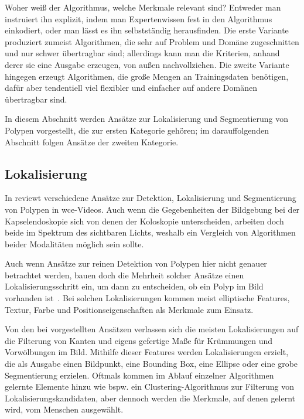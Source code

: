 Woher weiß der Algorithmus, welche Merkmale relevant sind?
Entweder man instruiert ihn explizit, indem man Expertenwissen fest in den Algorithmus einkodiert, oder man lässt es ihn selbstständig herausfinden.
Die erste Variante produziert zumeist Algorithmen, die sehr auf Problem und Domäne zugeschnitten und nur schwer übertragbar sind; allerdings kann man die Kriterien, anhand derer sie eine Ausgabe erzeugen, von außen nachvollziehen.
Die zweite Variante hingegen erzeugt Algorithmen, die große Mengen an Trainingsdaten benötigen, dafür aber tendentiell viel flexibler und einfacher auf andere Domänen übertragbar sind.

In diesem Abschnitt werden Ansätze zur Lokalisierung und Segmentierung von Polypen vorgestellt, die zur ersten Kategorie gehören; im darauffolgenden Abschnitt folgen Ansätze der zweiten Kategorie.



\subsection{Lokalisierung}

In \cite{Prasath.2016} reviewt \citeauthor{Prasath.2016} verschiedene Ansätze zur Detektion, Lokalisierung und Segmentierung von Polypen in \gls{wce}-Videos.
Auch wenn die Gegebenheiten der Bildgebung bei der Kapselendoskopie sich von denen der Koloskopie unterscheiden, arbeiten doch beide im Spektrum des sichtbaren Lichts, weshalb ein Vergleich von Algorithmen beider Modalitäten möglich sein sollte.

Auch wenn Ansätze zur reinen Detektion von Polypen hier nicht genauer betrachtet werden, bauen doch die Mehrheit solcher Ansätze einen Lokalisierungsschritt ein, um dann zu entscheiden, ob ein Polyp im Bild vorhanden ist~\cite{Prasath.2016}.
Bei solchen Lokalisierungen kommen meist elliptische Features, Textur, Farbe und Positionseigenschaften als Merkmale zum Einsatz.

Von den bei \cite{Prasath.2016} vorgestellten Ansätzen verlassen sich die meisten Lokalisierungen auf die Filterung von Kanten und eigens gefertige Maße für Krümmungen und Vorwölbungen im Bild.
Mithilfe dieser Features werden Lokalisierungen erzielt, die als Ausgabe einen Bildpunkt, eine Bounding Box, eine Ellipse oder eine grobe Segmentierung erzielen.
Oftmals kommen im Ablauf einzelner Algorithmen gelernte Elemente hinzu wie bspw. ein Clustering-Algorithmus zur Filterung von Lokalisierungskandidaten, aber dennoch werden die Merkmale, auf denen gelernt wird, vom Menschen ausgewählt.

